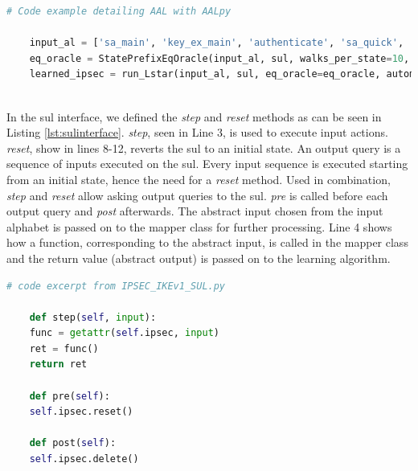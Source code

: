 \begin{lstlisting}[float=h, caption=Equivalence Query code, label=lst:eqcode, language=python]
	# Code example detailing AAL with AALpy
	
	input_al = ['sa_main', 'key_ex_main', 'authenticate', 'sa_quick', 'ack_quick']
	eq_oracle = StatePrefixEqOracle(input_al, sul, walks_per_state=10, walk_len=10)
	learned_ipsec = run_Lstar(input_al, sul, eq_oracle=eq_oracle, automaton_type='mealy', cache_and_non_det_check=True)
	
\end{lstlisting}

In the \ac{sul} interface, we defined the \emph{step} and \emph{reset} methods as can be seen in Listing \ref{lst:sulinterface}. \emph{step}, seen in Line 3, is used to execute input actions. \emph{reset}, show in lines 8-12, reverts the \ac{sul} to an initial state. An output query is a sequence of inputs executed on the \ac{sul}. Every input sequence is executed starting from an initial state, hence the need for a \emph{reset} method. Used in combination, \emph{step} and \emph{reset} allow asking output queries to the \ac{sul}. \emph{pre} is called before each output query and \emph{post} afterwards. The abstract input chosen from the input alphabet is passed on to the mapper class for further processing. Line 4 shows how a function, corresponding to the abstract input, is called in the mapper class and the return value (abstract output) is passed on to the learning algorithm. \\

\begin{lstlisting}[float=h, caption=SUL interface, label=lst:sulinterface, language=python]
	# code excerpt from IPSEC_IKEv1_SUL.py
	
	def step(self, input):
	func = getattr(self.ipsec, input)
	ret = func()
	return ret
	
	def pre(self):
	self.ipsec.reset()
	
	def post(self):
	self.ipsec.delete()
\end{lstlisting}

